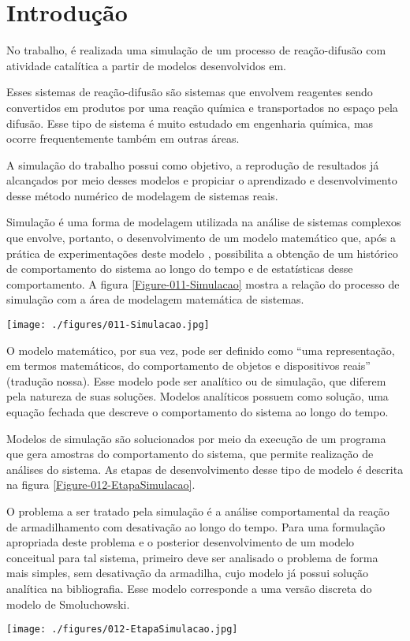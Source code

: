 
\section{Introdução}

No trabalho, é realizada uma simulação de um processo de reação-difusão com
atividade catalítica a partir de modelos desenvolvidos em\cite{3}.

Esses sistemas de reação-difusão são sistemas que envolvem reagentes sendo
convertidos em produtos por uma reação química e transportados no espaço pela
difusão. Esse tipo de sistema é muito estudado em engenharia química, mas ocorre
frequentemente também em outras áreas\cite{4}.

A simulação do trabalho possui como objetivo, a reprodução de resultados já
alcançados por meio desses modelos e propiciar o aprendizado e desenvolvimento
desse método numérico de modelagem de sistemas reais.

Simulação é uma forma de modelagem utilizada na análise de sistemas complexos
que envolve, portanto, o desenvolvimento de um modelo matemático que, após a
prática de experimentações deste modelo , possibilita a obtenção de um histórico
de comportamento do sistema ao longo do tempo e de estatísticas desse
comportamento\cite{1}. A figura \ref{Figure-011-Simulacao} mostra a relação do
processo de simulação com a área de modelagem matemática de sistemas.

{ \centering
	\hfill \break
	\captionsetup{type=figure}
	\texttt{[image: ./figures/011-Simulacao.jpg]}
	\label{Figure-011-Simulacao}
}

O modelo matemático, por sua vez, pode ser definido como ``uma
representação, em termos matemáticos, do comportamento de objetos e dispositivos
reais''\cite{2} (tradução nossa). Esse modelo pode ser analítico ou de
simulação, que diferem pela natureza de suas soluções. Modelos analíticos
possuem como solução, uma equação fechada que descreve o comportamento do
sistema ao longo do tempo\cite{1}.

Modelos de simulação são solucionados por meio da execução de um programa que
gera amostras do comportamento do sistema, que permite realização de análises
do sistema\cite{1}. As etapas de desenvolvimento desse tipo de modelo é
descrita na figura \ref{Figure-012-EtapaSimulacao}.

O problema a ser tratado pela simulação é a análise comportamental da reação de
armadilhamento com desativação ao longo do tempo. Para uma formulação apropriada
deste problema e o posterior desenvolvimento de um modelo conceitual para tal
sistema, primeiro deve ser analisado o problema de forma mais simples, sem
desativação da armadilha, cujo modelo já possui solução analítica na
bibliografia. Esse modelo corresponde a uma versão discreta do modelo de
Smoluchowski\cite{5}.

{ \centering
	\hfill \break
	\captionsetup{type=figure}
	\texttt{[image: ./figures/012-EtapaSimulacao.jpg]}
	\label{Figure-012-EtapaSimulacao}
}
